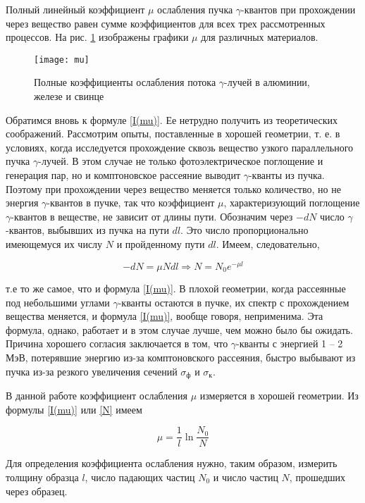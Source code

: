 Полный линейный коэффициент $\mu$ ослабления пучка $\gamma$-квантов при
прохождении через вещество равен сумме коэффициентов для всех трех рассмотренных
процессов. На рис. \ref{ris mu} изображены графики $\mu$ для различных
материалов.

\begin{figure}[h!]
  \centering
  \texttt{[image: mu]}
  \caption{Полные коэффициенты ослабления потока $\gamma$-лучей в алюминии, железе и свинце}
  \label{ris mu}
\end{figure}

Обратимся вновь к формуле \eqref{I(mu)}. Ее нетрудно получить из теоретических
соображений. Рассмотрим опыты, поставленные в хорошей геометрии, т. е. в
условиях, когда исследуется прохождение сквозь вещество узкого параллельного
пучка $\gamma$-лучей. В этом случае не только фотоэлектрическое поглощение и
генерация пар, но и комптоновское рассеяние выводит $\gamma$-кванты из пучка.
Поэтому при прохождении через вещество меняется только количество, но не энергия
$\gamma$-квантов в пучке, так что коэффициент $\mu$, характеризующий поглощение
$\gamma$-квантов в веществе, не зависит от длины пути. Обозначим через $-dN$
число $\gamma$-квантов, выбывших из пучка на пути $dl$. Это число
пропорционально имеющемуся их числу $N$ и пройденному пути $dl$. Имеем,
следовательно,

\begin{equation}\label{N}
-dN = \mu N dl \Rightarrow N = N_0 e^{-\mu l}
\end{equation}

т.е то же самое, что и формула \eqref{I(mu)}. В плохой геометрии, когда
рассеянные под небольшими углами $\gamma$-кванты остаются в пучке, их спектр с
прохождением вещества меняется, и формула \eqref{I(mu)}, вообще говоря,
неприменима. Эта формула, однако, работает и в этом случае лучше, чем можно было
бы ожидать. Причина хорошего согласия заключается в том, что $\gamma$-кванты с
энергией 1 -- 2 МэВ, потерявшие энергию из-за комптоновского рассеяния, быстро
выбывают из пучка из-за резкого увеличения сечений $\sigma_{\text{ф}}$ и
$\sigma_{\text{к}}$.

В данной работе коэффициент ослабления $ \mu $ измеряется в хорошей геометрии.
Из формулы \eqref{I(mu)} или \eqref{N} имеем

\begin{equation}\label{mu}
\mu = \dfrac{1}{l} \ln{\dfrac{N_0}{N}}
\end{equation}

Для определения коэффициента ослабления нужно, таким образом, измерить толщину
образца $l$, число падающих частиц $N_0$ и число частиц $N$, прошедших через
образец.